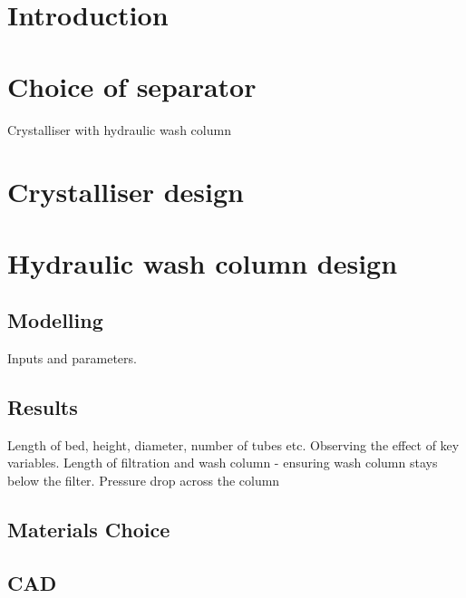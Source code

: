 \section{Introduction}


\section{Choice of separator}
Crystalliser with hydraulic wash column 


\section{Crystalliser design}




\section{Hydraulic wash column design}

\subsection{Modelling}
Inputs and parameters. 



\subsection{Results}
Length of bed, height, diameter, number of tubes etc. Observing the effect of key variables. Length of filtration and wash column - ensuring wash column stays below the filter. Pressure drop across the column

\subsection{Materials Choice}

\subsection{CAD}

